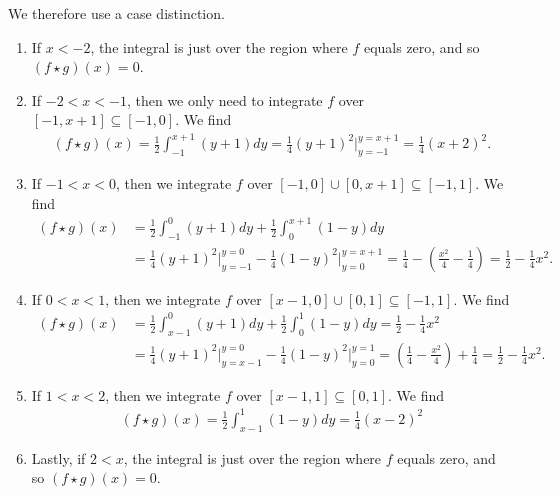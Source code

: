 \documentclass[11pt]{article}
\begin{document}
\begin{solution}
\begin{itemize}
        We therefore use a case distinction. 
        \begin{enumerate}
            \item If $x < -2$, the integral is just over the region where $f$ equals zero,
            and so $( f \star g )(x) = 0$.
            \item If $-2 < x < -1$, then we only need to integrate $f$ over $[-1,x+1] \subseteq [-1,0]$. We find 
            \begin{align*}
                (f \star g)(x) = \frac 1 2 \int_{-1}^{x + 1} (y + 1) dy = \frac 1 4 (y+1)^{2} \Big|_{y=-1}^{y=x+1} = \frac 1 4 (x + 2)^2.
            \end{align*}
            \item If $-1 < x < 0$, then we integrate $f$ over $[-1,0] \cup [0,x+1] \subseteq [-1,1]$. We find 
            \begin{align*}
                (f \star g)(x) 
                &
                = 
                \frac 1 2\int_{-1}^{0} (y + 1) dy + \frac 1 2\int_{0}^{x + 1} (1 - y) dy 
                \\&
                = 
                \frac 1 4 (y+1)^{2} \Big|_{y=-1}^{y=0} - \frac 1 4 (1-y)^{2} \Big|_{y=0}^{y=x+1}
                =  
                \frac 1 4 
                - 
                \left( \frac{x^{2}}{4} - \frac 1 4 \right) 
                =
                \frac 1 2 
                -
                \frac 1 4 x^2
                .
            \end{align*}
            \item If $0 < x < 1$, then we integrate $f$ over $[x-1,0] \cup [0,1] \subseteq [-1,1]$. We find 
            \begin{align*}
                (f \star g)(x) 
                &= 
                \frac 1 2 \int_{x - 1}^{0} (y + 1) dy + \frac 1 2 \int_{0}^{1} (1 - y) dy = \frac 1 2 - \frac 1 4 x^2
                \\&
                = 
                \frac 1 4 (y+1)^{2} \Big|_{y=x-1}^{y=0} - \frac 1 4 (1-y)^{2} \Big|_{y=0}^{y=1}
                =  
                \left( \frac 1 4 - \frac{x^{2}}{4} \right) 
                + 
                \frac 1 4 
                =
                \frac 1 2 
                -
                \frac 1 4 x^2
                .
            \end{align*}
            \item If $1 < x < 2$, then we integrate $f$ over $[x-1,1] \subseteq [0,1]$. We find 
            \begin{align*}
                (f \star g)(x) = \frac 1 2 \int_{x - 1}^{1} (1 - y) dy = \frac 1 4 ( x - 2)^2
            \end{align*}
            \item Lastly, if $2 < x$, the integral is just over the region where $f$ equals zero, 
            and so $( f \star g )(x) = 0$.
        \end{enumerate}



\end{itemize}
\end{solution}
\end{document}
